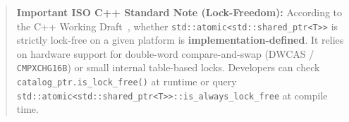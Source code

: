 \begin{quote}
\small \textbf{Important ISO C++ Standard Note (Lock-Freedom):} According to the C++ Working Draft~\cite{iso_cpp20, williams2019}, whether \texttt{std::atomic<std::shared\_ptr<T>>} is strictly lock-free on a given platform is \textbf{implementation-defined}. It relies on hardware support for double-word compare-and-swap (DWCAS / \texttt{CMPXCHG16B}) or small internal table-based locks. Developers can check \texttt{catalog\_ptr.is\_lock\_free()} at runtime or query \texttt{std::atomic<std::shared\_ptr<T>>::is\_always\_lock\_free} at compile time.
\end{quote}
